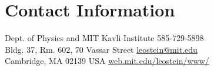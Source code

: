 \section{\sc Contact Information}
Dept. of Physics and MIT Kavli Institute            \hfill 585-729-5898 \\
Bldg. 37, Rm. 602, 70 Vassar Street    \hfill \href{mailto:leostein@mit.edu}{leostein@mit.edu}\\
Cambridge, MA 02139 USA \hfill \href{http://web.mit.edu/leostein/www/}{web.mit.edu/leostein/www/}

